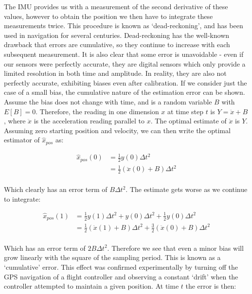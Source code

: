 \documentclass[capstone_report.tex]{subfiles}
\begin{document}
    The IMU provides us with a measurement of the second derivative of these values, however to obtain the position we then have to integrate these measurements twice. This procedure is known as `dead-reckoning', and has been used in navigation for several centuries. Dead-reckoning has the well-known drawback that errors are cumulative, so they continue to increase with each subsequent measurement. It is also clear that some error is unavoidable - even if our sensors were perfectly accurate, they are digital sensors which only provide a limited resolution in both time and amplitude. In reality, they are also not perfectly accurate, exhibiting biases even after calibration. If we consider just the case of a small bias, the cumulative nature of the estimation error can be shown.\\ 

    Assume the bias does not change with time, and is a random variable $B$ with $E[B]=0$. Therefore, the reading in one dimension $x$ at time step $t$ is $Y=\ddot{x}+B$, where $\ddot{x}$ is the acceleration reading parallel to $x$. The optimal estimate of $\ddot{x}$ is $Y$. Assuming zero starting position and velocity, we can then write the optimal estimator of $\hat{x}_{pos}$ as:

    \begin{align*}
    	\hat{x}_{pos}(0)&=\frac{1}{2}y(0)\Delta t^2\\
    	&=\frac{1}{2}(\ddot{x}(0)+B)\Delta t^2\\
    \end{align*}

    Which clearly has an error term of $B\Delta t^2$. The estimate gets worse as we continue to integrate:

    \begin{align*}
		\hat{x}_{pos}(1)&=\frac{1}{2}y(1)\Delta t^2+y(0)\Delta t^2+\frac{1}{2}y(0)\Delta t^2\\
		&=\frac{1}{2}(\ddot{x}(1)+B)\Delta t^2+\frac{3}{2}(\ddot{x}(0)+B)\Delta t^2\\   	
    \end{align*}

    Which has an error term of $2B\Delta t^2$. Therefore we see that even a minor bias will grow linearly with the square of the sampling period. This is known as a `cumulative' error. This effect was confirmed experimentally by turning off the GPS navigation of a flight controller and observing a constant `drift' when the controller attempted to maintain a given position. At time $t$ the error is then:
\end{document}
